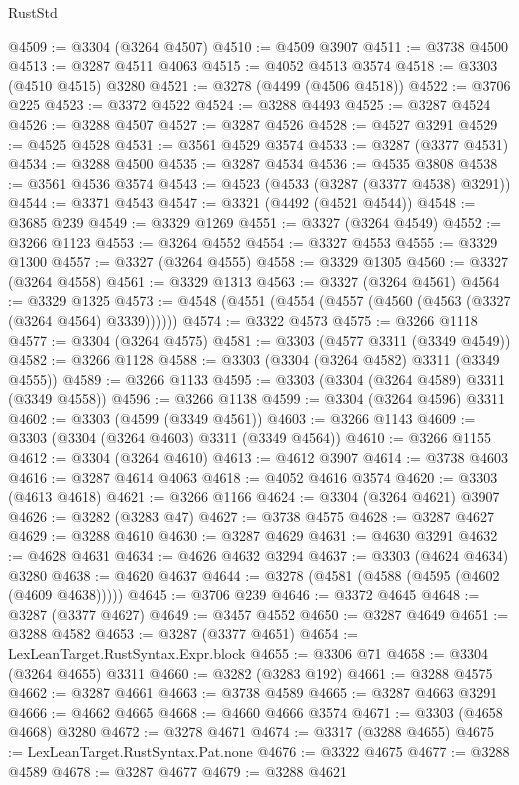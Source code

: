 \begin{lexlean}{RustStd}
\begin{coremodule}
{\begin{coremodule}
{{{{{{{{{{{{{{{{{{{{{{{{{{{{{{{{{@4509 := @3304 (@3264 @4507)
@4510 := @4509 @3907
@4511 := @3738 @4500
@4513 := @3287 @4511 @4063
@4515 := @4052 @4513 @3574
@4518 := @3303 (@4510 @4515) @3280
@4521 := @3278 (@4499 (@4506 @4518))
@4522 := @3706 @225
@4523 := @3372 @4522
@4524 := @3288 @4493
@4525 := @3287 @4524
@4526 := @3288 @4507
@4527 := @3287 @4526
@4528 := @4527 @3291
@4529 := @4525 @4528
@4531 := @3561 @4529 @3574
@4533 := @3287 (@3377 @4531)
@4534 := @3288 @4500
@4535 := @3287 @4534
@4536 := @4535 @3808
@4538 := @3561 @4536 @3574
@4543 := @4523 (@4533 (@3287 (@3377 @4538) @3291))
@4544 := @3371 @4543
@4547 := @3321 (@4492 (@4521 @4544))
@4548 := @3685 @239
@4549 := @3329 @1269
@4551 := @3327 (@3264 @4549)
@4552 := @3266 @1123
@4553 := @3264 @4552
@4554 := @3327 @4553
@4555 := @3329 @1300
@4557 := @3327 (@3264 @4555)
@4558 := @3329 @1305
@4560 := @3327 (@3264 @4558)
@4561 := @3329 @1313
@4563 := @3327 (@3264 @4561)
@4564 := @3329 @1325
@4573 := @4548 (@4551 (@4554 (@4557 (@4560 (@4563 (@3327 (@3264 @4564) @3339))))))
@4574 := @3322 @4573
@4575 := @3266 @1118
@4577 := @3304 (@3264 @4575)
@4581 := @3303 (@4577 @3311 (@3349 @4549))
@4582 := @3266 @1128
@4588 := @3303 (@3304 (@3264 @4582) @3311 (@3349 @4555))
@4589 := @3266 @1133
@4595 := @3303 (@3304 (@3264 @4589) @3311 (@3349 @4558))
@4596 := @3266 @1138
@4599 := @3304 (@3264 @4596) @3311
@4602 := @3303 (@4599 (@3349 @4561))
@4603 := @3266 @1143
@4609 := @3303 (@3304 (@3264 @4603) @3311 (@3349 @4564))
@4610 := @3266 @1155
@4612 := @3304 (@3264 @4610)
@4613 := @4612 @3907
@4614 := @3738 @4603
@4616 := @3287 @4614 @4063
@4618 := @4052 @4616 @3574
@4620 := @3303 (@4613 @4618)
@4621 := @3266 @1166
@4624 := @3304 (@3264 @4621) @3907
@4626 := @3282 (@3283 @47)
@4627 := @3738 @4575
@4628 := @3287 @4627
@4629 := @3288 @4610
@4630 := @3287 @4629
@4631 := @4630 @3291
@4632 := @4628 @4631
@4634 := @4626 @4632 @3294
@4637 := @3303 (@4624 @4634) @3280
@4638 := @4620 @4637
@4644 := @3278 (@4581 (@4588 (@4595 (@4602 (@4609 @4638)))))
@4645 := @3706 @239
@4646 := @3372 @4645
@4648 := @3287 (@3377 @4627)
@4649 := @3457 @4552
@4650 := @3287 @4649
@4651 := @3288 @4582
@4653 := @3287 (@3377 @4651)
@4654 := LexLeanTarget.RustSyntax.Expr.block
@4655 := @3306 @71
@4658 := @3304 (@3264 @4655) @3311
@4660 := @3282 (@3283 @192)
@4661 := @3288 @4575
@4662 := @3287 @4661
@4663 := @3738 @4589
@4665 := @3287 @4663 @3291
@4666 := @4662 @4665
@4668 := @4660 @4666 @3574
@4671 := @3303 (@4658 @4668) @3280
@4672 := @3278 @4671
@4674 := @3317 (@3288 @4655)
@4675 := LexLeanTarget.RustSyntax.Pat.none
@4676 := @3322 @4675
@4677 := @3288 @4589
@4678 := @3287 @4677
@4679 := @3288 @4621
}}}}}}}}}}}}}}}}}}}}}}}}}}}}}}}}}
\end{coremodule}}
\end{coremodule}
\end{lexlean}
